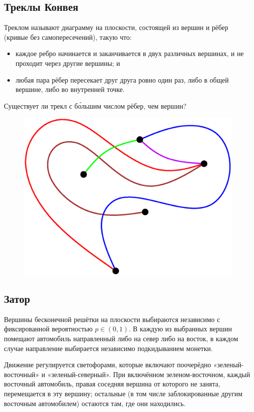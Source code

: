 \subsection*{Треклы Конвея}

Треклом называют диаграмму на плоскости, состоящей из вершин и рёбер (кривые без самопересечений), такую что:
\begin{itemize}
\item каждое ребро начинается и заканчивается в двух различных вершинах, и не проходит через другие вершины; и
\item любая пара рёбер пересекает друг друга ровно один раз, либо в общей вершине, либо во внутренней точке.
\end{itemize}

Существует ли трекл с б\'{о}льшим числом рёбер, чем вершин?

\begin{figure}[h!]
\centering
\includegraphics[scale=0.5]{Figs/UnsolvedPuzzles/thrack}
\end{figure}

\subsection*{Затор}

Вершины бесконечной решётки на плоскости выбираются независимо с фиксированной вероятностью $p\in (0,1)$.
В каждую из выбранных вершин помещают автомобиль направленный либо на север либо на восток,
в каждом  случае направление выбирается независимо подкидыванием монетки.

Движение регулируется светофорами, которые включают поочерёдно «зеленый-восточный» и «зеленый-северный».
При включённом зеленом-восточном, каждый восточный автомобиль, правая соседняя вершина от которого не занята, перемещается в эту вершину; остальные (в том числе заблокированные другим восточным автомобилем) остаются там, где они находились.


